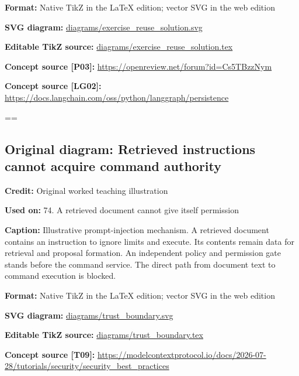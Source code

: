\documentclass[10pt,letterpaper]{article}
\begin{document}
\textbf{Format:} Native TikZ in the LaTeX edition; vector SVG in the web edition\par
\textbf{SVG diagram:} \href{diagrams/exercise_reuse_solution.svg}{\small\ttfamily diagrams/\allowbreak{}exercise\_\allowbreak{}reuse\_\allowbreak{}solution.\allowbreak{}svg}\par
\textbf{Editable TikZ source:} \href{diagrams/exercise_reuse_solution.tex}{\small\ttfamily diagrams/\allowbreak{}exercise\_\allowbreak{}reuse\_\allowbreak{}solution.\allowbreak{}tex}\par
\textbf{Concept source [P03]:} \href{https://openreview.net/forum?id=Cs5TBzzNym}{\small\ttfamily https:/\allowbreak{}/\allowbreak{}openreview.\allowbreak{}net/\allowbreak{}forum?\allowbreak{}id=\allowbreak{}Cs5TBzzNym}\par
\textbf{Concept source [LG02]:} \href{https://docs.langchain.com/oss/python/langgraph/persistence}{\small\ttfamily https:/\allowbreak{}/\allowbreak{}docs.\allowbreak{}langchain.\allowbreak{}com/\allowbreak{}oss/\allowbreak{}python/\allowbreak{}langgraph/\allowbreak{}persistence}\par
\egroup\par\noindent\box\readingEntry\par\medskip
\setbox\readingEntry=\vbox\bgroup\hsize=\linewidth\subsection*{Original diagram: Retrieved instructions cannot acquire command authority}
\textbf{Credit:} Original worked teaching illustration\par
\textbf{Used on:} 74. A retrieved document cannot give itself permission\par
\textbf{Caption:} Illustrative prompt-injection mechanism. A retrieved document contains an instruction to ignore limits and execute. Its contents remain data for retrieval and proposal formation. An independent policy and permission gate stands before the command service. The direct path from document text to command execution is blocked.\par
\textbf{Format:} Native TikZ in the LaTeX edition; vector SVG in the web edition\par
\textbf{SVG diagram:} \href{diagrams/trust_boundary.svg}{\small\ttfamily diagrams/\allowbreak{}trust\_\allowbreak{}boundary.\allowbreak{}svg}\par
\textbf{Editable TikZ source:} \href{diagrams/trust_boundary.tex}{\small\ttfamily diagrams/\allowbreak{}trust\_\allowbreak{}boundary.\allowbreak{}tex}\par
\textbf{Concept source [T09]:} \href{https://modelcontextprotocol.io/docs/2026-07-28/tutorials/security/security_best_practices}{\small\ttfamily https:/\allowbreak{}/\allowbreak{}modelcontextprotocol.\allowbreak{}io/\allowbreak{}docs/\allowbreak{}2026-\allowbreak{}07-\allowbreak{}28/\allowbreak{}tutorials/\allowbreak{}security/\allowbreak{}security\_\allowbreak{}best\_\allowbreak{}practices}\par
\egroup\par\noindent\box\readingEntry\par\medskip
\end{document}
